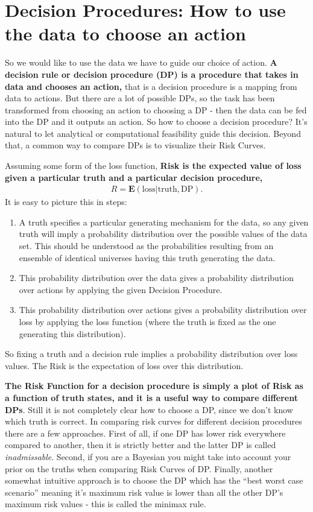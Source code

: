 \section{Decision Procedures: How to use the data to choose an action}
So we would like to use the data we have to guide our choice of action.\textbf{ A decision rule or decision procedure (DP) is a procedure that takes in data and chooses an action,} that is a decision procedure is a mapping from data to actions. But there are a lot of possible DPs, so the task has been transformed from choosing an action to choosing a DP - then the data can be fed into the DP and it outputs an action. So how to choose a decision procedure? It's natural to let analytical or computational feasibility guide this decision. Beyond that, a common way to compare DPs is to visualize their Risk Curves.
\n

Assuming some form of the loss function, \textbf{Risk is the expected value of loss given a particular truth and a particular decision procedure,} 
\begin{align}
R = \mathbf{E}(\mathrm{loss} | \mathrm{truth, DP}).
\end{align}
It is easy to picture this in steps:  
\begin{enumerate}  
\item  A truth specifies a particular generating mechanism for the data, so any given truth will imply a probability distribution over the possible values of the data set. This should be understood as the probabilities resulting from an ensemble of identical universes having this truth generating the data. 
\item This probability distribution over the data gives a probability distribution over actions by applying the given Decision Procedure.
\item This probability distribution over actions gives a probability distribution over loss by applying the loss function (where the truth is fixed as the one generating this distribution).
\end{enumerate}
So fixing a truth and a decision rule implies a probability distribution over loss values. The Risk is the expectation of loss over this distribution.
\n

 \textbf{The Risk Function for a decision procedure is simply a plot of Risk as a function of truth states, and it is a useful way to compare different DPs}. Still it is not completely clear how to choose a DP, since we don't know which truth is correct. In comparing risk curves for different decision procedures there are a few approaches. First of all, if one DP has lower risk everywhere compared to another, then it is strictly better and the latter DP is called \emph{inadmissable}.  Second, if you are a Bayesian you might take into account your prior on the truths when comparing Risk Curves of DP. Finally, another somewhat intuitive approach is to choose the DP which has the ``best worst case scenario'' meaning it's maximum risk value is lower than all the other DP's maximum risk values - this is called the minimax rule. 
\n

